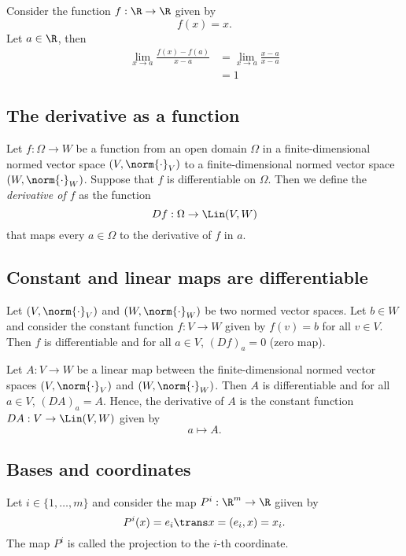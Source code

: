 \begin{example}
    Consider the function $f: \R \to \R$ given by
    $$f(x) = x.$$
    Let $a \in \R$, then
    \begin{align*}
        \lim_{x \to a}\frac{f(x)-f(a)}{x-a} &= \lim_{x \to a}\frac{x-a}{x-a} \\
                                            &= 1
    \end{align*}
\end{example}

\subsection{The derivative as a function}
\begin{definition}
    Let $f: \Omega \to W$ be a function from an open domain $\Omega$ in a finite-dimensional
    normed vector space $(V, \norm{\cdot}_V)$ to a finite-dimensional normed vector space
    $(W,\norm{\cdot}_W)$. Suppose that $f$ is differentiable on $\Omega$. Then we
    define the \emph{derivative of $f$} as the function
    $$Df:\Omega \to \Lin(V,W)$$
    that maps every $a \in \Omega$ to the derivative of $f$ in $a$.
\end{definition}

\subsection{Constant and linear maps are differentiable}
\begin{proposition}
    Let $(V,\norm{\cdot}_V)$ and $(W,\norm{\cdot}_W)$ be two normed vector
    spaces. Let $b \in W$ and consider the constant function $f: V \to W$
    given by $f(v) = b$ for all $v \in V$. Then $f$ is differentiable and
    for all $a \in V$, $(Df)_a = 0$ (zero map).
\end{proposition}

\begin{proposition}
    Let $A: V \to W$ be a linear map between the finite-dimensional normed
    vector spaces $(V,\norm{\cdot}_V)$ and $(W,\norm{\cdot}_W)$. Then $A$ is
    differentiable and for all $a \in V$, $(DA)_a = A$. Hence, the derivative
    of $A$ is the constant function $DA: V \to \Lin(V,W)$ given by
    $$a \mapsto A.$$
\end{proposition}

\subsection{Bases and coordinates}
\begin{definition}
    Let $i \in \{1,\dots,m\}$ and consider the map $P^i:\R^m \to \R$ giiven by
    $$P^i(x) = e_i\trans x = (e_i,x) = x_i.$$
    The map $P^i$ is called the projection to the $i$-th coordinate.
\end{definition}

